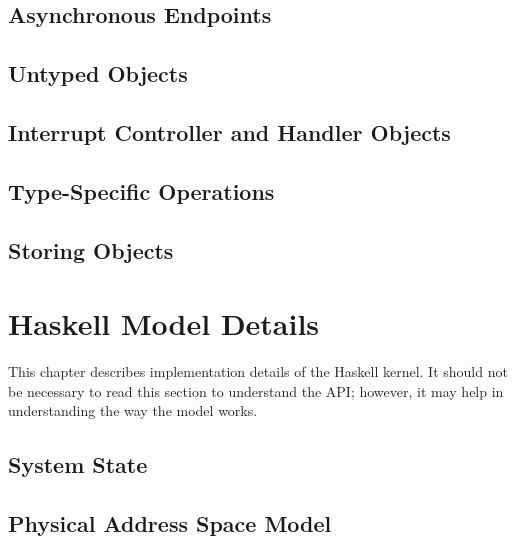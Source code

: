 \documentclass[a4paper,11pt,twoside]{report}
\begin{document}
\section{Asynchronous Endpoints}\label{sec:object.asyncendpoint}


\section{Untyped Objects}\label{sec:object.untyped}


\section{Interrupt Controller and Handler Objects}\label{sec:object.interrupt}


\section{Type-Specific Operations}\label{sec:object.objecttype}


\section{Storing Objects}\label{sec:object.instances}


\chapter{Haskell Model Details}\label{sec:model}

This chapter describes implementation details of the Haskell kernel. It should not be necessary to read this section to understand the API; however, it may help in understanding the way the model works.

\section{System State}\label{sec:model.statedata}


\section{Physical Address Space Model}\label{sec:model.pspace}

\end{document}
